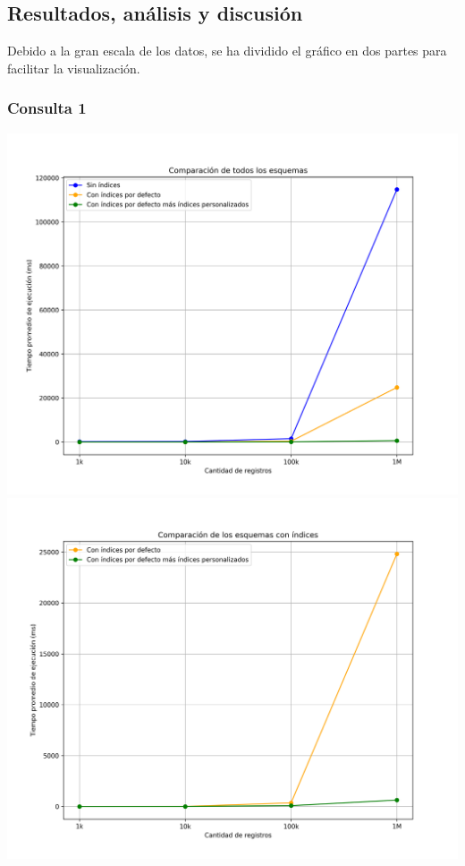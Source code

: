\subsection{Resultados, análisis y discusión}
Debido a la gran escala de los datos, se ha dividido el gráfico en dos partes para facilitar la visualización. %
\subsubsection{Consulta 1}
\begin{center}
	\includegraphics[width=\linewidth, keepaspectratio]{figures/query_1_execution_times_1.png}
	\includegraphics[width=\linewidth, keepaspectratio]{figures/query_1_execution_times_2.png}
\end{center}
